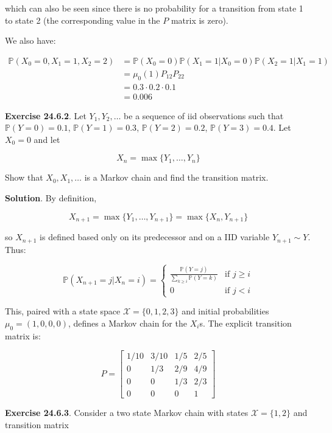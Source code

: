 which can also be seen since there is no probability for a transition
from state 1 to state 2 (the corresponding value in the \(P\) matrix is
zero).

We also have:

\begin{align*}
\mathbb{P}(X_{0} = 0, X_{1} = 1, X_{2} = 2) &= \mathbb{P}(X_{0} = 0) \mathbb{P}(X_{1} = 1 | X_{0} = 0) \mathbb{P}(X_{2} = 1 | X_{1} = 1) \\
&= \mu_{0}(1) P_{12} P_{22} \\
& = 0.3 \cdot 0.2 \cdot 0.1 \\
& = 0.006
\end{align*}

\textbf{Exercise 24.6.2}. Let \(Y_{1}, Y_{2}, \dots\) be a sequence of iid
observations such that \(\mathbb{P}(Y = 0) = 0.1\),
\(\mathbb{P}(Y = 1) = 0.3\), \(\mathbb{P}(Y = 2) = 0.2\),
\(\mathbb{P}(Y = 3) = 0.4\). Let \(X_{0} = 0\) and let

\[ X_{n} = \max \{ Y_{1}, \dots, Y_{n} \} \]

Show that \(X_{0}, X_{1}, \dots\) is a Markov chain and find the transition
matrix.

\textbf{Solution}. By definition,

\[ X_{n + 1} = \max \{Y_{1}, \dots, Y_{n+1} \} = \max \{ X_{n}, Y_{n + 1} \} \]

so \(X_{n + 1}\) is defined based only on its predecessor and on a IID
variable \(Y_{n+1} \sim Y\). Thus:

\[ \mathbb{P}(X_{n + 1} = j | X_{n} = i) = \begin{cases}
\frac{\mathbb{P}(Y = j)}{\sum_{k \geq i} \mathbb{P}(Y = k)} & \text{if } j \geq i \\
0 &\text{if } j < i
\end{cases} \]

This, paired with a state space $\mathcal{X} = \{ 0, 1, 2, 3 \} $ and
initial probabilities \(\mu_{0} = (1, 0, 0, 0)\), defines a Markov chain
for the \(X_{i}\)s. The explicit transition matrix is:

\[ P = \begin{bmatrix}
1/10 & 3/10 & 1/5 & 2/5 \\
0   & 1/3 & 2/9 & 4/9 \\
0   & 0   & 1/3 & 2/3 \\
0   & 0   & 0   & 1
\end{bmatrix}\]

\textbf{Exercise 24.6.3}. Consider a two state Markov chain with states
\(\mathcal{X} = \{ 1, 2 \}\) and transition matrix

